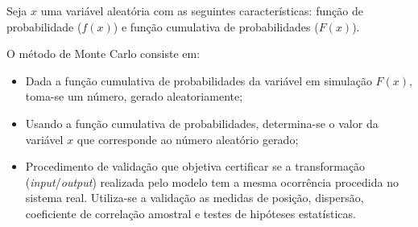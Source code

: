     Seja $x$ uma variável aleatória com as seguintes características: função de probabilidade ($f(x)$) e função cumulativa de probabilidades ($F(x)$).
    
    O método de Monte Carlo consiste em:
    \begin{itemize}
        \item Dada a função cumulativa de probabilidades da variável em simulação $F(x)$, toma-se um número, gerado aleatoriamente;
        \item Usando a função cumulativa de probabilidades, determina-se o valor da variável $x$ que corresponde ao número aleatório gerado;
        \item Procedimento de validação que objetiva certificar se a transformação (\textit{input}/\textit{output}) realizada pelo modelo tem a mesma ocorrência procedida no sistema real. Utiliza-se a validação as medidas de posição, dispersão, coeficiente de correlação amostral e testes de hipóteses estatísticas.
    \end{itemize}
    
